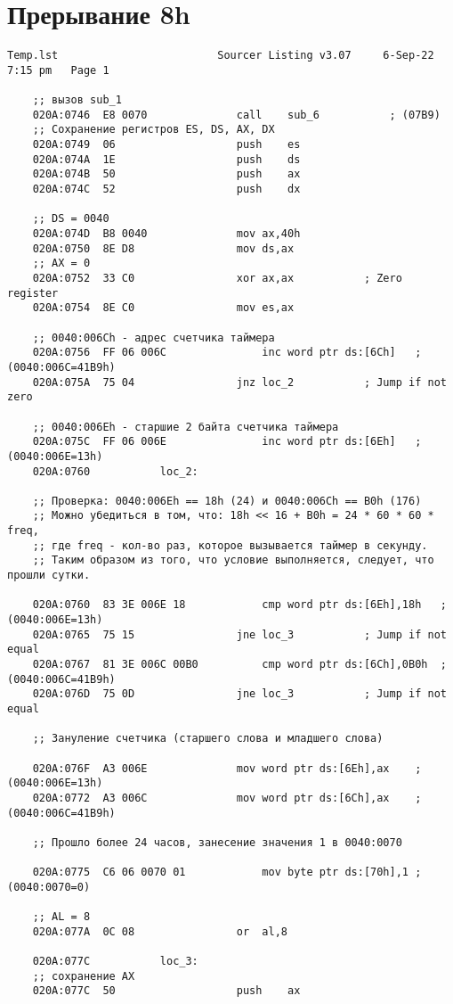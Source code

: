 \documentclass[a4paper,12pt]{bmstu}
\begin{document}
\section{Прерывание 8h}\label{sec:Dis_int}
\begin{lstlisting}[style={asm},label={lst:INT8H}]
    Temp.lst						 Sourcer Listing v3.07     6-Sep-22   7:15 pm   Page 1

    ;; вызов sub_1
    020A:0746  E8 0070				call	sub_6			; (07B9)
    ;; Сохранение регистров ES, DS, AX, DX
    020A:0749  06					push	es
    020A:074A  1E					push	ds
    020A:074B  50					push	ax
    020A:074C  52					push	dx

    ;; DS = 0040
    020A:074D  B8 0040				mov	ax,40h
    020A:0750  8E D8				mov	ds,ax
    ;; AX = 0
    020A:0752  33 C0				xor	ax,ax			; Zero register
    020A:0754  8E C0				mov	es,ax

    ;; 0040:006Ch - адрес счетчикa таймера
    020A:0756  FF 06 006C				inc	word ptr ds:[6Ch]	; (0040:006C=41B9h)
    020A:075A  75 04				jnz	loc_2			; Jump if not zero

    ;; 0040:006Eh - старшие 2 байта счетчикa таймера
    020A:075C  FF 06 006E				inc	word ptr ds:[6Eh]	; (0040:006E=13h)
    020A:0760			loc_2:

    ;; Проверка: 0040:006Eh == 18h (24) и 0040:006Ch == B0h (176)
    ;; Можно убедиться в том, что: 18h << 16 + B0h = 24 * 60 * 60 * freq,
    ;; где freq - кол-во раз, которое вызывается таймер в секунду.
    ;; Таким образом из того, что условие выполняется, следует, что прошли сутки.

    020A:0760  83 3E 006E 18			cmp	word ptr ds:[6Eh],18h	; (0040:006E=13h)
    020A:0765  75 15				jne	loc_3			; Jump if not equal
    020A:0767  81 3E 006C 00B0			cmp	word ptr ds:[6Ch],0B0h	; (0040:006C=41B9h)
    020A:076D  75 0D				jne	loc_3			; Jump if not equal

    ;; Зануление счетчика (старшего слова и младшего слова)

    020A:076F  A3 006E				mov	word ptr ds:[6Eh],ax	; (0040:006E=13h)
    020A:0772  A3 006C				mov	word ptr ds:[6Ch],ax	; (0040:006C=41B9h)

    ;; Прошло более 24 часов, занесение значения 1 в 0040:0070

    020A:0775  C6 06 0070 01			mov	byte ptr ds:[70h],1	; (0040:0070=0)

    ;; AL = 8
    020A:077A  0C 08				or	al,8

    020A:077C			loc_3:
    ;; cохранение AX
    020A:077C  50					push	ax


\end{lstlisting}
\end{document}
